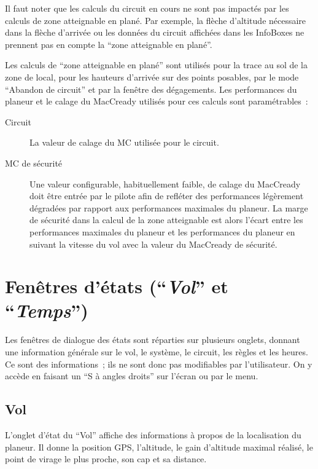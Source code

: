 Il faut noter que les calculs du circuit en cours ne sont pas impactés par les calculs de zone atteignable en plané.
Par exemple, la flèche d'altitude nécessaire dans la flèche d'arrivée
ou les données du circuit affichées dans les InfoBoxes ne prennent pas en compte la ``zone atteignable en plané''.

Les calculs de ``zone atteignable en plané'' sont utilisés pour la trace au sol de la zone de local,
pour les hauteurs d'arrivée sur des points posables, par le mode ``Abandon de circuit'' et par la fenêtre des dégagements.
Les performances du planeur et le calage du MacCready utilisés pour ces calculs sont paramétrables~:
\begin{description}
\item[Circuit] La valeur de calage du MC utilisée pour le circuit.
\item[MC de sécurité] Une valeur configurable, habituellement faible, de calage du MacCready doit être entrée par le pilote
afin de refléter des performances légèrement dégradées par rapport aux performances maximales du planeur. La marge de sécurité
dans la calcul de la zone atteignable est alors l'écart entre les performances maximales du planeur et les performances
du planeur en suivant la vitesse du vol avec la valeur du MacCready de sécurité.
\end{description}

\section{Fenêtres d'états (``\emph{Vol}'' et ``\emph{Temps}'')}\label{sec:flight-status}

Les fenêtres de dialogue des états sont réparties sur plusieurs onglets, donnant une information générale sur le
vol, le système, le circuit, les règles et les heures.
Ce sont des informations~; ils ne sont donc pas modifiables par l'utilisateur.
On y accède en faisant un ``S à angles droits'' sur l'écran ou par le menu.
\begin{quote}
\blink{}
\end{quote}

\subsection*{Vol}
L'onglet d'état du ``Vol'' affiche des informations à propos de la localisation du planeur. Il donne la position GPS, l'altitude, le
gain d'altitude maximal réalisé, le point de virage le plus proche, son cap et sa distance.


